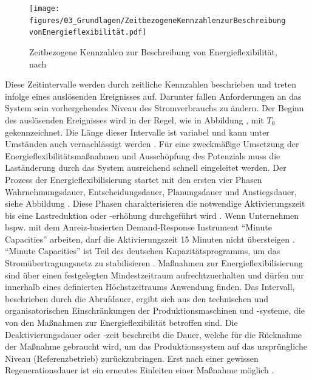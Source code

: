\begin{figure}[h]
	\centering
	\texttt{[image: figures/03\_Grundlagen/ZeitbezogeneKennzahlenzurBeschreibungvonEnergieflexibilität.pdf]}
	\caption{Zeitbezogene Kennzahlen zur Beschreibung von Energieflexibilität, nach \cite{VDI5207Blatt2020}}
	\label{fig_03Zeitbezogene Kennzahlen zur Beschreibung von Energieflexibilität}
\end{figure}

Diese Zeitintervalle werden durch zeitliche Kennzahlen beschrieben und treten infolge eines auslösenden Ereignisses auf. Darunter fallen Anforderungen an das System sein vorhergehendes Niveau des Stromverbrauchs zu ändern. Der Beginn des auslösenden Ereignisses wird in der Regel, wie in Abbildung , mit $T_0$ gekennzeichnet. Die Länge dieser Intervalle ist variabel und kann unter Umständen auch vernachlässigt werden \cite{VDI5207Blatt2020}. Für eine zweckmäßige Umsetzung der Energieflexibilitätsmaßnahmen und Ausschöpfung des Potenzials muss die Laständerung durch das System ausreichend schnell eingeleitet werden. Der Prozess der Energieflexibilisierung startet mit den ersten vier Phasen Wahrnehmungsdauer, Entscheidungsdauer, Planungsdauer und Anstiegsdauer, siehe Abbildung . Diese Phasen charakterisieren die notwendige Aktivierungszeit bis eine Lastreduktion oder -erhöhung durchgeführt wird \cite{grasslEvaluatingMeasuresAdapting2014}. Wenn Unternehmen bspw. mit dem Anreiz-basierten Demand-Response Instrument “Minute Capacities” arbeiten, darf die Aktivierungszeit 15 Minuten nicht übersteigen \cite{riedelGermanElectricityReserve2007}. “Minute Capacities” ist Teil des deutschen Kapazitätsprogramms, um das Stromübertragungsnetz zu stabilisieren \cite{grasslEvaluatingMeasuresAdapting2014}. Maßnahmen zur Energieflexibilisierung sind über einen festgelegten Mindestzeitraum aufrechtzuerhalten und dürfen nur innerhalb eines definierten Höchstzeitraums Anwendung finden. Das Intervall, beschrieben durch die Abrufdauer, ergibt sich aus den technischen und organisatorischen Einschränkungen der Produktionsmaschinen und -systeme, die von den Maßnahmen zur Energieflexibilität betroffen sind. Die Deaktivierungsdauer oder -zeit beschreibt die Dauer, welche für die Rücknahme der Maßnahme gebraucht wird, um das Produktionssystem auf das ursprüngliche Niveau (Referenzbetrieb) zurückzubringen. Erst nach einer gewissen Regenerationsdauer ist ein erneutes Einleiten einer Maßnahme möglich \cite{grasslEvaluatingMeasuresAdapting2014}.\\ 

